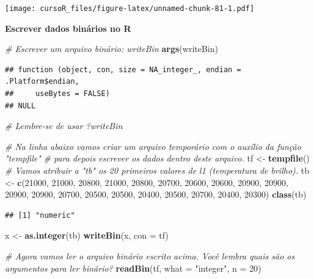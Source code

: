 \documentclass[]{book}
\newenvironment{Shaded}{\begin{snugshade}}{\end{snugshade}}
\newcommand{\KeywordTok}[1]{\textcolor[rgb]{0.13,0.29,0.53}{\textbf{#1}}}
\newcommand{\DataTypeTok}[1]{\textcolor[rgb]{0.13,0.29,0.53}{#1}}
\newcommand{\DecValTok}[1]{\textcolor[rgb]{0.00,0.00,0.81}{#1}}
\newcommand{\StringTok}[1]{\textcolor[rgb]{0.31,0.60,0.02}{#1}}
\newcommand{\CommentTok}[1]{\textcolor[rgb]{0.56,0.35,0.01}{\textit{#1}}}
\newcommand{\NormalTok}[1]{#1}
\theoremstyle{definition}
\theoremstyle{definition}
\theoremstyle{definition}
\theoremstyle{remark}
\begin{document}
\texttt{[image: cursoR\_files/figure-latex/unnamed-chunk-81-1.pdf]}

\textbf{Escrever dados binários no R}

\begin{Shaded}
\begin{Highlighting}[]
\CommentTok{# Escrever um arquivo binário: writeBin}
\KeywordTok{args}\NormalTok{(writeBin)}
\end{Highlighting}
\end{Shaded}

\begin{verbatim}
## function (object, con, size = NA_integer_, endian = .Platform$endian, 
##     useBytes = FALSE) 
## NULL
\end{verbatim}

\begin{Shaded}
\begin{Highlighting}[]
\CommentTok{# Lembre-se de usar ?writeBin}

\CommentTok{# Na linha abaixo vamos criar um arquivo temporário com o auxílio da função "tempfile" }
\CommentTok{# para depois escrever os dados dentro deste arquivo.}
\NormalTok{tf <-}\StringTok{ }\KeywordTok{tempfile}\NormalTok{()}
\CommentTok{# Vamos atribuir a "tb" os 20 primeiros valores de l1 (temperatura de brilho).}
\NormalTok{tb <-}\StringTok{ }\KeywordTok{c}\NormalTok{(}\DecValTok{21000}\NormalTok{, }\DecValTok{21000}\NormalTok{, }\DecValTok{20800}\NormalTok{, }\DecValTok{21000}\NormalTok{, }\DecValTok{20800}\NormalTok{, }\DecValTok{20700}\NormalTok{, }\DecValTok{20600}\NormalTok{, }\DecValTok{20600}\NormalTok{, }\DecValTok{20900}\NormalTok{, }\DecValTok{20900}\NormalTok{, }
        \DecValTok{20900}\NormalTok{, }\DecValTok{20900}\NormalTok{, }\DecValTok{20700}\NormalTok{, }\DecValTok{20500}\NormalTok{, }\DecValTok{20500}\NormalTok{, }\DecValTok{20400}\NormalTok{, }\DecValTok{20500}\NormalTok{, }\DecValTok{20700}\NormalTok{, }\DecValTok{20400}\NormalTok{, }\DecValTok{20300}\NormalTok{)}
\KeywordTok{class}\NormalTok{(tb)}
\end{Highlighting}
\end{Shaded}

\begin{verbatim}
## [1] "numeric"
\end{verbatim}

\begin{Shaded}
\begin{Highlighting}[]
\NormalTok{x <-}\StringTok{ }\KeywordTok{as.integer}\NormalTok{(tb)}
\KeywordTok{writeBin}\NormalTok{(x, }\DataTypeTok{con =}\NormalTok{ tf)}

\CommentTok{# Agora vamos ler o arquivo binário escrito acima. Você lembra quais são os argumentos para ler binário?}
\KeywordTok{readBin}\NormalTok{(tf,}
        \DataTypeTok{what =} \StringTok{"integer"}\NormalTok{,}
        \DataTypeTok{n =} \DecValTok{20}\NormalTok{)}
\end{Highlighting}
\end{Shaded}
\end{document}
